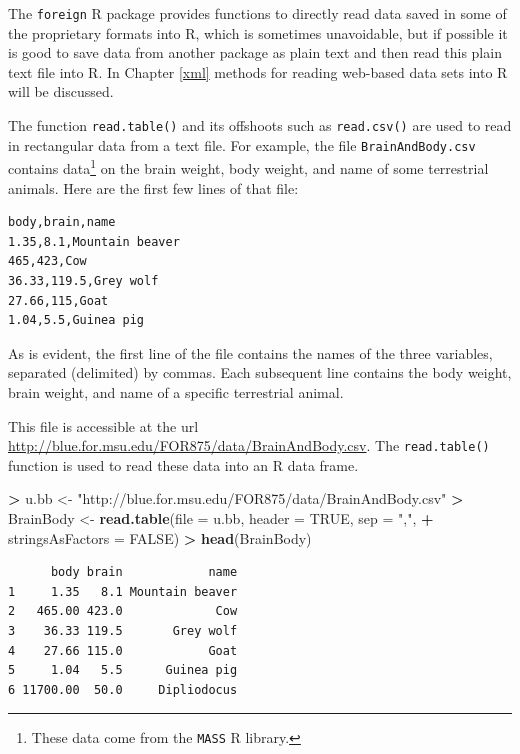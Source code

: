 \documentclass[]{krantz}
\makeatletter
\newenvironment{Shaded}{\begin{snugshade}}{\end{snugshade}}
\newcommand{\DataTypeTok}[1]{\textcolor[rgb]{0.27,0.27,0.27}{#1}}
\newcommand{\KeywordTok}[1]{\textcolor[rgb]{0.27,0.27,0.27}{\textbf{#1}}}
\newcommand{\NormalTok}[1]{#1}
\newcommand{\OperatorTok}[1]{\textcolor[rgb]{0.43,0.43,0.43}{\textbf{#1}}}
\newcommand{\OtherTok}[1]{\textcolor[rgb]{0.37,0.37,0.37}{#1}}
\newcommand{\StringTok}[1]{\textcolor[rgb]{0.5,0.5,0.5}{#1}}
\newenvironment{kframe}{%
\medskip{}
\setlength{\fboxsep}{.8em}
 \def\at@end@of@kframe{}%
 \ifinner\ifhmode%
  \def\at@end@of@kframe{\end{minipage}}%
  \begin{minipage}{\columnwidth}%
 \fi\fi%
 \def\FrameCommand##1{\hskip\@totalleftmargin \hskip-\fboxsep
 \colorbox{shadecolor}{##1}\hskip-\fboxsep
     \hskip-\linewidth \hskip-\@totalleftmargin \hskip\columnwidth}%
 \MakeFramed {\advance\hsize-\width
   \@totalleftmargin\z@ \linewidth\hsize
   \@setminipage}}%
 {\par\unskip\endMakeFramed%
 \at@end@of@kframe}
\renewenvironment{Shaded}{\begin{kframe}}{\end{kframe}}
\makeatother
\begin{document}
The \texttt{foreign} R package provides functions to directly read data saved in some of the proprietary formats into R, which is sometimes unavoidable, but if possible it is good to save data from another package as plain text and then read this plain text file into R. In Chapter \ref{xml} methods for reading web-based data sets into R will be discussed.

The function \texttt{read.table()} and its offshoots such as \texttt{read.csv()} are used to read in rectangular data from a text file. For example, the file \texttt{BrainAndBody.csv} contains data\footnote{These data come from the \texttt{MASS} R library.} on the brain weight, body weight, and name of some terrestrial animals. Here are the first few lines of that file:

\begin{verbatim}
body,brain,name
1.35,8.1,Mountain beaver
465,423,Cow
36.33,119.5,Grey wolf
27.66,115,Goat
1.04,5.5,Guinea pig
\end{verbatim}

As is evident, the first line of the file contains the names of the three variables, separated (delimited) by commas. Each subsequent line contains the body weight, brain weight, and name of a specific terrestrial animal.

This file is accessible at the url \url{http://blue.for.msu.edu/FOR875/data/BrainAndBody.csv}. The \texttt{read.table()} function is used to read these data into an R data frame.

\begin{Shaded}
\begin{Highlighting}[]
\OperatorTok{>}\StringTok{ }\NormalTok{u.bb <-}\StringTok{ "http://blue.for.msu.edu/FOR875/data/BrainAndBody.csv"}
\OperatorTok{>}\StringTok{ }\NormalTok{BrainBody <-}\StringTok{ }\KeywordTok{read.table}\NormalTok{(}\DataTypeTok{file =}\NormalTok{ u.bb, }\DataTypeTok{header =} \OtherTok{TRUE}\NormalTok{, }\DataTypeTok{sep =} \StringTok{","}\NormalTok{, }
\OperatorTok{+}\StringTok{                         }\DataTypeTok{stringsAsFactors =} \OtherTok{FALSE}\NormalTok{)}
\OperatorTok{>}\StringTok{ }\KeywordTok{head}\NormalTok{(BrainBody)}
\end{Highlighting}
\end{Shaded}

\begin{verbatim}
      body brain            name
1     1.35   8.1 Mountain beaver
2   465.00 423.0             Cow
3    36.33 119.5       Grey wolf
4    27.66 115.0            Goat
5     1.04   5.5      Guinea pig
6 11700.00  50.0     Dipliodocus
\end{verbatim}
\end{document}

